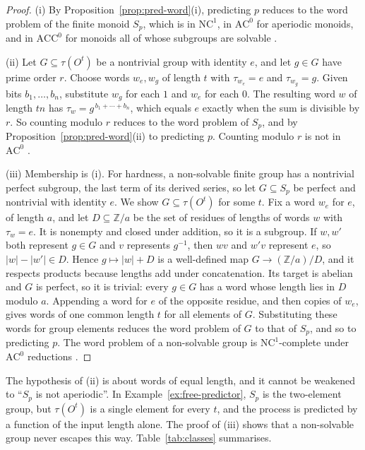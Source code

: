 \documentclass[10pt]{article}
\theoremstyle{definition}
\theoremstyle{remark}
\newcommand{\Obs}{O}
\begin{document}
\begin{proof}
(i) By Proposition~\ref{prop:pred-word}(i), predicting $p$ reduces to
the word problem of the finite monoid $S_p$, which is in
$\mathrm{NC}^1$, in $\mathrm{AC}^0$ for aperiodic monoids, and in
$\mathrm{ACC}^0$ for monoids all of whose subgroups are solvable
\cite{BarringtonTherien1988,BarringtonEtAl1992}.

(ii) Let $G\subseteq\tau(\Obs^t)$ be a nontrivial group with identity
$e$, and let $g\in G$ have prime order $r$.  Choose words $w_e,w_g$
of length $t$ with $\tau_{w_e}=e$ and $\tau_{w_g}=g$.  Given bits
$b_1,\ldots,b_n$, substitute $w_g$ for each $1$ and $w_e$ for each
$0$.  The resulting word $w$ of length $tn$ has
$\tau_w=g^{\,b_1+\cdots+b_n}$, which equals $e$ exactly when the sum
is divisible by $r$.  So counting modulo $r$ reduces to the word
problem of $S_p$, and by Proposition~\ref{prop:pred-word}(ii) to
predicting $p$.  Counting modulo $r$ is not in $\mathrm{AC}^0$
\cite{Smolensky1987}.

(iii) Membership is (i).  For hardness, a non-solvable finite group
has a nontrivial perfect subgroup, the last term of its derived
series, so let $G\subseteq S_p$ be perfect and nontrivial with
identity $e$.  We show $G\subseteq\tau(\Obs^t)$ for some $t$.  Fix a
word $w_e$ for $e$, of length $a$, and let
$D\subseteq\mathbb Z/a$ be the set of residues of lengths of words
$w$ with $\tau_w=e$.  It is nonempty and closed under addition, so it
is a subgroup.  If $w,w'$ both represent $g\in G$ and $v$ represents
$g^{-1}$, then $wv$ and $w'v$ represent $e$, so $|w|-|w'|\in D$.
Hence $g\mapsto|w|+D$ is a well-defined map
$G\to(\mathbb Z/a)/D$, and it respects products because lengths add
under concatenation.  Its target is abelian and $G$ is perfect, so
it is trivial: every $g\in G$ has a word whose length lies in $D$
modulo $a$.  Appending a word for $e$ of the opposite residue, and
then copies of $w_e$, gives words of one common length $t$ for all
elements of $G$.  Substituting these words for group elements
reduces the word problem of $G$ to that of $S_p$, and so to
predicting $p$.  The word problem of a non-solvable group is
$\mathrm{NC}^1$-complete under $\mathrm{AC}^0$ reductions
\cite{Barrington1989}.
\end{proof}

The hypothesis of (ii) is about words of equal length, and it cannot
be weakened to ``$S_p$ is not aperiodic''.  In
Example~\ref{ex:free-predictor}, $S_p$ is the two-element group, but
$\tau(\Obs^t)$ is a single element for every $t$, and the process is
predicted by a function of the input length alone.  The proof of
(iii) shows that a non-solvable group never escapes this way.
Table~\ref{tab:classes} summarises.
\end{document}
